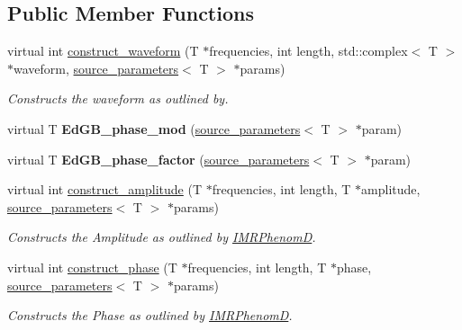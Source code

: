 \subsection*{Public Member Functions}
\begin{DoxyCompactItemize}
\item 
virtual int \hyperlink{classEdGB__IMRPhenomD__log_afbb021b8af2b53b51ca24d7c29c0d487}{construct\+\_\+waveform} (T $\ast$frequencies, int length, std\+::complex$<$ T $>$ $\ast$waveform, \hyperlink{structsource__parameters}{source\+\_\+parameters}$<$ T $>$ $\ast$params)
\begin{DoxyCompactList}\small\item\em Constructs the waveform as outlined by. \end{DoxyCompactList}\item 
\mbox{\label{classEdGB__IMRPhenomD__log_a79bb77d3ca14ef95ea54026556ede906}} 
virtual T {\bfseries Ed\+G\+B\+\_\+phase\+\_\+mod} (\hyperlink{structsource__parameters}{source\+\_\+parameters}$<$ T $>$ $\ast$param)
\item 
\mbox{\label{classEdGB__IMRPhenomD__log_a866e031a86d736e7fc88beb987cd41e8}} 
virtual T {\bfseries Ed\+G\+B\+\_\+phase\+\_\+factor} (\hyperlink{structsource__parameters}{source\+\_\+parameters}$<$ T $>$ $\ast$param)
\item 
virtual int \hyperlink{classEdGB__IMRPhenomD__log_ac6acdf1b0231e33b861202bcd9c51ee7}{construct\+\_\+amplitude} (T $\ast$frequencies, int length, T $\ast$amplitude, \hyperlink{structsource__parameters}{source\+\_\+parameters}$<$ T $>$ $\ast$params)
\begin{DoxyCompactList}\small\item\em Constructs the Amplitude as outlined by \hyperlink{classIMRPhenomD}{I\+M\+R\+PhenomD}. \end{DoxyCompactList}\item 
virtual int \hyperlink{classEdGB__IMRPhenomD__log_a62aa82aaadc4210d09e95f8807f8f3c4}{construct\+\_\+phase} (T $\ast$frequencies, int length, T $\ast$phase, \hyperlink{structsource__parameters}{source\+\_\+parameters}$<$ T $>$ $\ast$params)
\begin{DoxyCompactList}\small\item\em Constructs the Phase as outlined by \hyperlink{classIMRPhenomD}{I\+M\+R\+PhenomD}. \end{DoxyCompactList}\end{DoxyCompactItemize}



